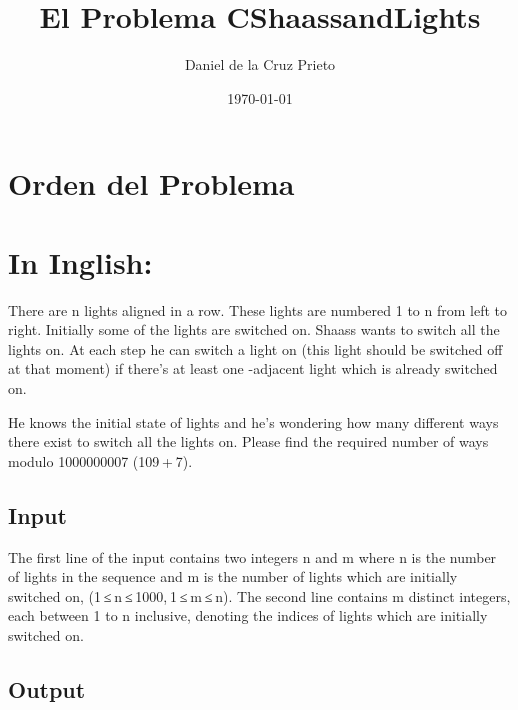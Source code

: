\documentclass[12pt]{article}
\begin{document}
    \title{El Problema CShaassandLights}
    \author{Daniel de la Cruz Prieto}
    \date{\today}

    \maketitle 

    \section*{Orden del Problema}

    \section*{In Inglish:}

    \begin{flushleft}
        There are n lights aligned in a row. These lights are numbered 1 to n from left to right. Initially some of the lights are switched on. Shaass wants to switch all the lights on. At each step he can switch a light on (this light should be switched off at that moment) if there's at least one -adjacent light which is already switched on. 
    \end{flushleft}
    \begin{flushleft}
        He knows the initial state of lights and he's wondering how many different ways there exist to switch all the lights on. Please find the required number of ways modulo 1000000007 (109 + 7).
    \end{flushleft}

    \subsection*{Input}

    \begin{flushleft}
        The first line of the input contains two integers n and m where n is the number of lights in the sequence and m is the number of lights which are initially switched on, (1 ≤ n ≤ 1000, 1 ≤ m ≤ n). The second line contains m distinct integers, each between 1 to n inclusive, denoting the indices of lights which are initially switched on.
    \end{flushleft}

    \subsection*{Output}
\end{document}
